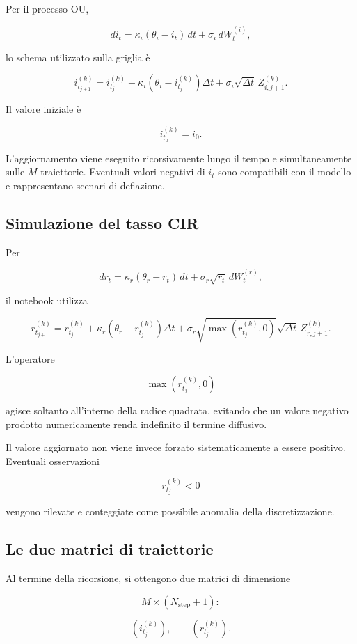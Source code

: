 Per il processo OU,

\[
di_t
=
\kappa_i(\theta_i-i_t)\,dt
+
\sigma_i\,dW_t^{(i)},
\]

\noindent lo schema utilizzato sulla griglia \`e

\[
i_{t_{j+1}}^{(k)}
=
i_{t_j}^{(k)}
+
\kappa_i
\left(
\theta_i-i_{t_j}^{(k)}
\right)
\Delta t
+
\sigma_i\sqrt{\Delta t}\,
Z_{i,j+1}^{(k)}.
\]

Il valore iniziale \`e

\[
i_{t_0}^{(k)}=i_0.
\]

L'aggiornamento viene eseguito ricorsivamente lungo il tempo e
simultaneamente sulle \(M\) traiettorie. Eventuali valori negativi di
\(i_t\) sono compatibili con il modello e rappresentano scenari di deflazione.

\subsection{Simulazione del tasso CIR}

Per

\[
dr_t
=
\kappa_r(\theta_r-r_t)\,dt
+
\sigma_r\sqrt{r_t}\,dW_t^{(r)},
\]

il notebook utilizza

\[
r_{t_{j+1}}^{(k)}
=
r_{t_j}^{(k)}
+
\kappa_r
\left(
\theta_r-r_{t_j}^{(k)}
\right)
\Delta t
+
\sigma_r
\sqrt{\max(r_{t_j}^{(k)},0)}
\sqrt{\Delta t}\,
Z_{r,j+1}^{(k)}.
\]

L'operatore

\[
\max(r_{t_j}^{(k)},0)
\]

\noindent agisce soltanto all'interno della radice quadrata, evitando che un valore
negativo prodotto numericamente renda indefinito il termine diffusivo.

Il valore aggiornato non viene invece forzato sistematicamente a essere
positivo. Eventuali osservazioni

\[
r_{t_j}^{(k)}<0
\]

\noindent vengono rilevate e conteggiate come possibile anomalia della
discretizzazione.

\subsection{Le due matrici di traiettorie}

Al termine della ricorsione, si ottengono due matrici di dimensione

\[
M\times(N_{\mathrm{step}}+1):
\]

\[
\left(
i_{t_j}^{(k)}
\right),
\qquad
\left(
r_{t_j}^{(k)}
\right).
\]

